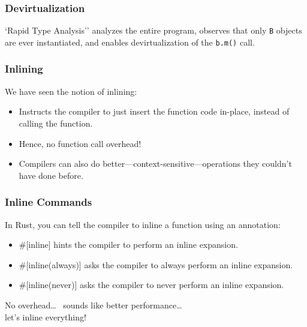 \begin{frame}
\frametitle{Devirtualization}

`Rapid Type Analysis'' analyzes the entire program, observes that
only {\tt B} objects are ever instantiated, and enables devirtualization
of the {\tt b.m()} call.

\end{frame}

\begin{frame}
  \frametitle{Inlining}

  

  We have seen the notion of inlining:
  \begin{itemize}
    \item Instructs the compiler to just insert the function code in-place,
      instead of calling the function.
    \item Hence, no function call overhead!
    \item Compilers can also do better---context-sensitive---operations they couldn't
      have done before.
  \end{itemize}
  \vfill
\end{frame}

\begin{frame}
\frametitle{Inline Commands}

In Rust, you can tell the compiler to inline a function using an annotation:
\begin{itemize}
 \item \#[inline] hints the compiler to perform an inline expansion.
 \item \#[inline(always)] asks the compiler to always perform an inline expansion.
 \item \#[inline(never)] asks the compiler to never perform an inline expansion.
\end{itemize}

  
  No overhead\ldots~ sounds like better performance\ldots~ \\let's inline everything!
  
\end{frame}

